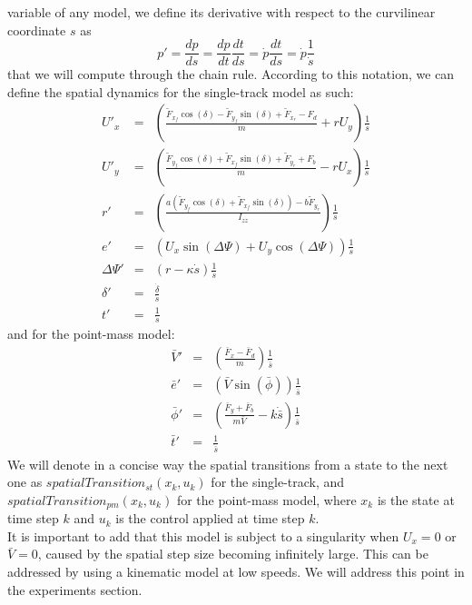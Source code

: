 \documentclass[a4paper, onecolumn, 11pt]{article}
\begin{document}
variable of any model, we define its derivative with respect to the curvilinear
coordinate $s$ as
\begin{equation}
    p' = \frac{d p}{d s} = \frac{dp}{dt} \frac{dt}{ds} = \dot{p} \frac{dt}{ds} = \dot{p} \frac{1}{\dot{s}}
\end{equation}  
that we will compute through the chain rule.
According to this notation, we can define the spatial dynamics for the single-track model as such:
\begin{subequations}
    \begin{eqnarray}
        U'_x &=& \left(\frac{\tilde{F}_{x_f}\cos(\delta)-\tilde{F}_{y_f}\sin(\delta)+\tilde{F}_{x_r}-F_d}{m}+rU_y\right) \frac{1}{\dot{s}}\\
        U'_y &=& \left(\frac{\tilde{F}_{y_f}\cos(\delta)+\tilde{F}_{x_f}\sin(\delta)+\tilde{F}_{y_r}+F_b}{m}-rU_x\right) \frac{1}{\dot{s}}\\
        r' &=& \left(\frac{a(\tilde{F}_{y_f}\cos(\delta)+\tilde{F}_{x_f}\sin(\delta))-b\tilde{F}_{y_r}}{I_{zz}}\right) \frac{1}{\dot{s}}\\
        e' &=& \left(U_x\sin(\Delta \varPsi)+U_y \cos(\Delta \varPsi)\right) \frac{1}{\dot{s}}\\
        \Delta \varPsi' &=& \left(r-\kappa \dot{s}\right) \frac{1}{\dot{s}}\\
        \delta ' &=& \frac{\dot{\delta}}{\dot{s}}\\
        t' &=& \frac{1}{\dot{s}}
    \end{eqnarray}
\end{subequations}
and for the point-mass model:
\begin{subequations}
    \begin{eqnarray}
        {\bar{V}}' &=& \left(\frac{\bar{F}_{x}-\bar{F}_{d}}{m}\right) \frac{1}{\dot{\bar{s}}}\\
        {\bar{e}}' &=& \left(\bar{V}\sin(\bar{\phi})\right)\frac{1}{\dot{\bar{s}}}\\
        {\bar{\phi}}' &=& \left(\frac{{\bar{F}}_y + {\bar{F}}_b}{m\bar{V}} - k\dot{\bar{s}}\right)\frac{1}{\dot{\bar{s}}}\\
        \bar{t}' &=& \frac{1}{\dot{\bar{s}}}
    \end{eqnarray}
\end{subequations}
We will denote in a concise way the spatial transitions from a state to the next one as
$spatialTransition_{st}(x_k, u_k)$ for the single-track, and $spatialTransition_{pm}(x_k, u_k)$ 
for the point-mass model, where $x_k$ is the state at time step $k$ and $u_k$ is the control
applied at time step $k$. \\
It is important to add that this model is subject to a singularity when $U_x=0$
or $\bar V=0$, caused by the spatial step size becoming infinitely large. This
can be addressed by using a kinematic model at low speeds. We will address this
point in the experiments section. 
\end{document}
